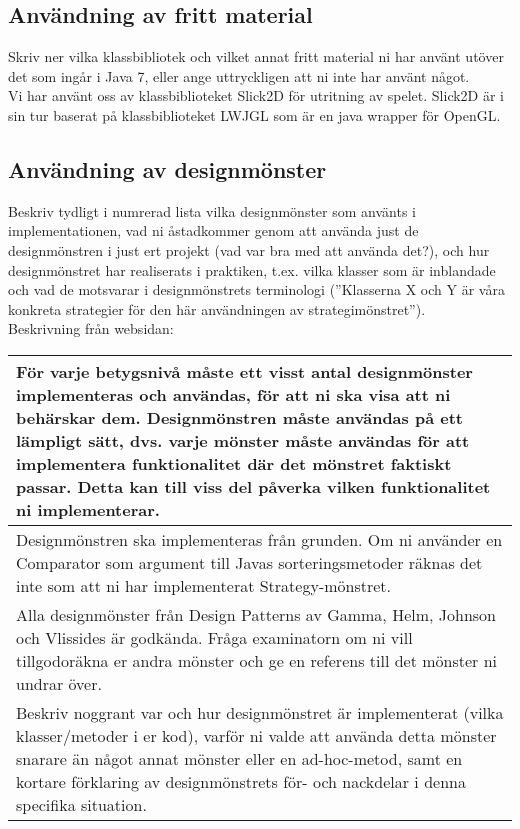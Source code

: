 \subsection{Användning av fritt material}
{\color{red}Skriv ner vilka klassbibliotek och vilket annat fritt material ni har använt utöver det som ingår i Java 7, eller ange uttryckligen att ni inte har använt något.\\}
Vi har använt oss av klassbiblioteket Slick2D för utritning av spelet. Slick2D är i sin tur baserat på klassbiblioteket LWJGL som är en java wrapper för OpenGL.
\subsection{Användning av designmönster}
{\color{red}Beskriv tydligt i numrerad lista vilka designmönster som använts i implementationen, vad ni åstadkommer genom att använda just de designmönstren i just ert projekt (vad var bra med att använda det?), och hur designmönstret har realiserats i praktiken, t.ex. vilka klasser som är inblandade och vad de motsvarar i designmönstrets terminologi (”Klasserna X och Y är våra konkreta strategier för den här användningen av strategimönstret”).\\
Beskrivning från websidan:\\
\begin{tabular}{| p{11cm} |}
    \hline
    För varje betygsnivå måste ett visst antal designmönster implementeras och användas, för att ni ska visa att ni behärskar dem. Designmönstren måste användas på ett lämpligt sätt, dvs. varje mönster måste användas för att implementera funktionalitet där det mönstret faktiskt passar. Detta kan till viss del påverka vilken funktionalitet ni implementerar. \\ \hline
    Designmönstren ska implementeras från grunden. Om ni använder en Comparator som argument till Javas sorteringsmetoder räknas det inte som att ni har implementerat Strategy-mönstret. \\ \hline
    Alla designmönster från Design Patterns av Gamma, Helm, Johnson och Vlissides är godkända. Fråga examinatorn om ni vill tillgodoräkna er andra mönster och ge en referens till det mönster ni undrar över. \\ \hline
    Beskriv noggrant var och hur designmönstret är implementerat (vilka klasser/metoder i er kod), varför ni valde att använda detta mönster snarare än något annat mönster eller en ad-hoc-metod, samt en kortare förklaring av designmönstrets för- och nackdelar i denna specifika situation. \\ \hline
\end{tabular}\\}
